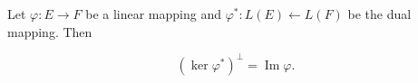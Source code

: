 Let $\varphi: E \rightarrow F$ be a linear mapping and $\varphi^*: L(E) \leftarrow L(F)$ be the dual mapping. Then

$$(\ker \varphi^*)^\perp = \operatorname{Im} \varphi.$$
